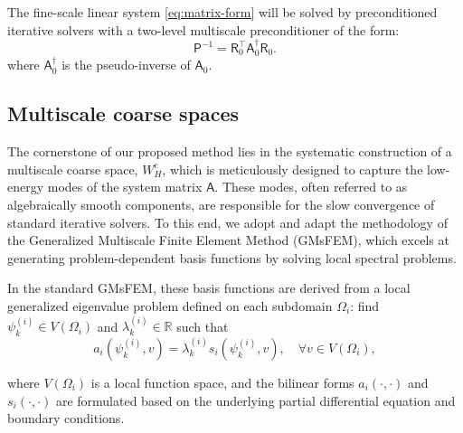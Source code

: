 \documentclass[preprint,12pt]{elsarticle}
\begin{document}
  The fine-scale linear system \eqref{eq:matrix-form} will be solved by
  preconditioned iterative solvers with a two-level multiscale preconditioner of
  the form:
  \[
    \mathsf{P}^{-1}= \mathsf{R}_{0}^{\intercal}\mathsf{A}_{0}^{\dagger}\mathsf{R}
    _{0}.
  \]
  where $\mathsf{A}_{0}^{\dagger}$ is the pseudo-inverse of $\mathsf{A}_{0}$.

  \subsection{Multiscale coarse spaces}
  The cornerstone of our proposed method lies in the systematic construction of a
  multiscale coarse space, $W_{H}^{\text{c}}$, which is meticulously designed to
  capture the low-energy modes of the system matrix $\mathsf{A}$. These modes, often
  referred to as algebraically smooth components, are responsible for the slow
  convergence of standard iterative solvers. To this end, we adopt and adapt the
  methodology of the Generalized Multiscale Finite Element Method (GMsFEM), which
  excels at generating problem-dependent basis functions by solving local spectral
  problems.

  In the standard GMsFEM, these basis functions are derived from a local
  generalized eigenvalue problem defined on each subdomain $\Omega_{i}$: find $\psi
  _{k}^{(i)}\in V(\Omega_{i})$ and $\lambda_{k}^{(i)}\in \mathbb{R}$ such that
  \begin{equation*}
    \label{eq:eigenproblem}a_{i}(\psi_{k}^{(i)}, v) = \lambda_{k}^{(i)}s_{i}(\psi
    _{k}^{(i)}, v), \quad \forall v \in V(\Omega_{i}),
  \end{equation*}

  where $V(\Omega_{i})$ is a local function space, and the bilinear forms $a_{i}(
  \cdot, \cdot)$ and $s_{i}(\cdot, \cdot)$ are formulated based on the underlying
  partial differential equation and boundary conditions.
\end{document}
